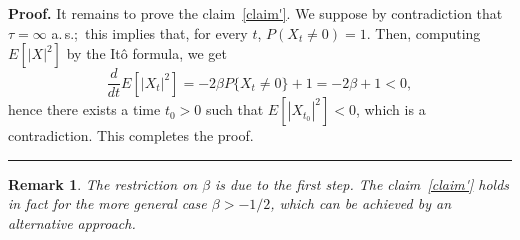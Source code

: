 \documentclass[a4paper,10pt]{article}
\newtheorem{remark}[theorem]{Remark}
\newenvironment{proof}[1][Proof]{\noindent\textbf{#1.} }{\ \rule{0.5em}{0.5em}}
\begin{document}
\begin{proof}
It remains to prove the claim~\eqref{claim'}. We suppose by contradiction that $\tau=\infty$ a.\,s.;\ this implies that, for every $t$, $P(X_t\neq0)=1$. Then, computing $E[|X|^2]$ by the It\^o formula, we get
\begin{equation*}
\frac{d}{dt}E[|X_t|^2]=-2\beta P\{X_t\neq0\}+1=-2\beta+1<0,
\end{equation*}
hence there exists a time $t_0>0$ such that $E[|X_{t_0}|^2]<0$, which is a contradiction. This completes the proof.
\end{proof}

\begin{remark}
The restriction on $\beta$ is due to the first step. The claim~\eqref{claim'} holds in fact for the more general case $\beta>-1/2$, which can be achieved by an alternative approach.
\end{remark}
\end{document}
